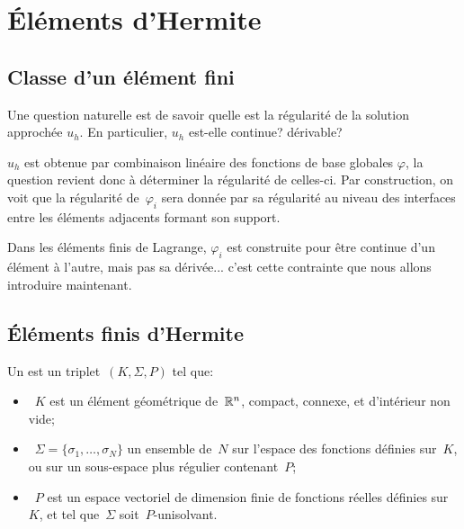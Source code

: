 \medskip
\section{Éléments d'Hermite}

\medskip
\subsection{Classe d'un élément fini}

Une question naturelle est de savoir quelle est la régularité de la solution approchée $u_h$. En particulier, $u_h$ est-elle continue? dérivable?

$u_h$ est obtenue par combinaison linéaire des fonctions de base globales $\varphi$, la question revient donc à déterminer la régularité de celles-ci. Par construction, on voit que la régularité de~$\varphi_i$ sera donnée par sa régularité au niveau des interfaces entre les éléments adjacents formant son support.

Dans les éléments finis de Lagrange, $\varphi_i$ est construite pour être continue d'un élément à l'autre, mais pas sa dérivée... c'est cette contrainte que nous allons introduire maintenant.


\medskip
\subsection{Éléments finis d'Hermite}

\begin{definition}
Un  est un triplet~$(K, \Sigma, P)$ tel que:
\begin{itemize}
\item~$K$ est un élément géométrique de~$\mathbb R^n$, compact, connexe, et d'intérieur non vide;
\item~$\Sigma=\{\sigma_1,\ldots, \sigma_N\}$ un ensemble de~$N$  sur l'espace des fonctions définies sur~$K$, ou sur un sous-espace plus régulier contenant~$P$;
\item~$P$ est un espace vectoriel de dimension finie de fonctions réelles définies sur~$K$, et tel que~$\Sigma$ soit~$P$-unisolvant.
\end{itemize}
\end{definition}

